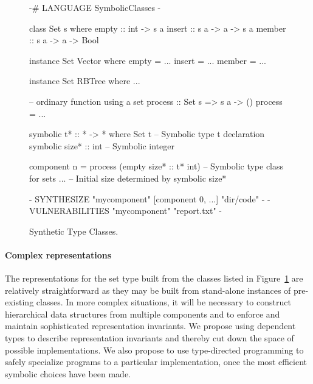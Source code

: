 \begin{figure}[t]
\centering
\begin{mylisting}
{-# LANGUAGE SymbolicClasses -}

class Set s where
  empty :: int -> s a
  insert :: s a -> a -> s a
  member :: s a -> a -> Bool

instance Set Vector where
  empty = ...
  insert = ...
  member = ...

instance Set RBTree where
  ...

-- ordinary function using a set
process :: Set s => s a -> ()
process = ...

symbolic t* :: * -> * where Set t   -- Symbolic type t declaration
symbolic size* :: int               -- Symbolic integer

component n =
  process (empty size* :: t* int)   -- Symbolic type class for sets
  ...                               -- Initial size determined by symbolic size*

{- SYNTHESIZE "mycomponent" [component 0, ...]  "dir/code" -}
{- VULNERABILITIES "mycomponent" "report.txt" -}

\end{mylisting}
\caption{Synthetic Type Classes.}
\label{fig:type-class-set}
\end{figure}

\paragraph*{Complex representations}

The representations for the set type built from the classes listed in
Figure~\ref{fig:type-class-set} are relatively straightforward as they
may be built from stand-alone instances of pre-existing classes.  In
more complex situations, it will be necessary to construct
hierarchical data structures from multiple components and to enforce
and maintain sophisticated representation invariants.  We propose
using dependent types to describe representation invariants and thereby
cut down the space of possible implementations.  We also propose to use
type-directed programming to safely specialize programs to a particular
implementation, once the most efficient symbolic choices have been made.

